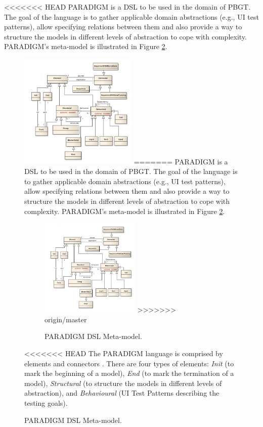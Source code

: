 \documentclass[conference]{IEEEtran}
\begin{document}
\begin{enumerate}
<<<<<<< HEAD
PARADIGM is a DSL to be used in the domain of PBGT. The goal of the language is to gather applicable domain abstractions (e.g., UI test patterns), allow specifying relations between them and also provide a way to structure the models in different levels of abstraction to cope with complexity. PARADIGM's meta-model is illustrated in Figure \ref{fig:dsl}.

\begin{figure}[!htb]
\centering
\includegraphics[width=0.5\textwidth]{dsl}
=======
PARADIGM is a DSL to be used in the domain of PBGT. The goal of the language is to gather applicable domain abstractions (e.g., UI test patterns), allow specifying relations between them and also provide a way to structure the models in different levels of abstraction to cope with complexity. PARADIGM's meta-model is illustrated in Figure \ref{fig:dsl}.\\
\begin{figure}[!htb]
\centering
\includegraphics[width=0.52\textwidth]{dsl}
>>>>>>> origin/master
\caption{PARADIGM DSL Meta-model.}
\label{fig:dsl}
\end{figure}

<<<<<<< HEAD
The PARADIGM language is comprised by elements and connectors \cite{moreira2013pattern}. There are four types of elements: \textit{Init} (to mark the beginning of a model), \textit{End} (to mark the termination of a model), \textit{Structural} (to structure the models in different levels of abstraction), and \textit{Behavioural} (UI Test Patterns describing the testing goals).


\end{figure}
\end{enumerate}
\end{document}
